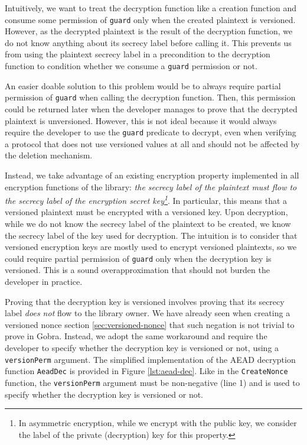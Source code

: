 Intuitively, we want to treat the decryption function like a creation function and consume some permission of \texttt{guard} only when the created plaintext is versioned.
However, as the decrypted plaintext is the result of the decryption function, we do not know anything about its secrecy label before calling it. This prevents us from using the plaintext secrecy label in a precondition to the decryption function to condition whether we consume a \texttt{guard} permission or not.

An easier doable solution to this problem would be to always require partial permission of \texttt{guard} when calling the decryption function.
Then, this permission could be returned later when the developer manages to prove that the decrypted plaintext is unversioned.
However, this is not ideal because it would always require the developer to use the \texttt{guard} predicate to decrypt, even when verifying a protocol that does not use versioned values at all and should not be affected by the deletion mechanism.

Instead, we take advantage of an existing encryption property implemented in all encryption functions of the library: \emph{the secrecy label of the plaintext must flow to the secrecy label of the encryption secret key\footnote{In asymmetric encryption, while we encrypt with the public key, we consider the label of the private (decryption) key for this property.}}.
In particular, this means that a versioned plaintext must be encrypted with a versioned key.
Upon decryption, while we do not know the secrecy label of the plaintext to be created, we know the secrecy label of the key used for decryption.
The intuition is to consider that versioned encryption keys are mostly used to encrypt versioned plaintexts, so we could require partial permission of \texttt{guard} only when the decryption key is versioned.
This is a sound overapproximation that should not burden the developer in practice.

Proving that the decryption key is versioned involves proving that its secrecy label \emph{does not} flow to the library owner. We have already seen when creating a versioned nonce section \ref{sec:versioned-nonce} that such negation is not trivial to prove in Gobra.
Instead, we adopt the same workaround and require the developer to specify whether the decryption key is versioned or not, using a \texttt{versionPerm} argument.
The simplified implementation of the AEAD decryption function \texttt{AeadDec} is provided in Figure \ref{lst:aead-dec}.
Like in the \texttt{CreateNonce} function, the \texttt{versionPerm} argument must be non-negative (line 1) and is used to specify whether the decryption key is versioned or not.

